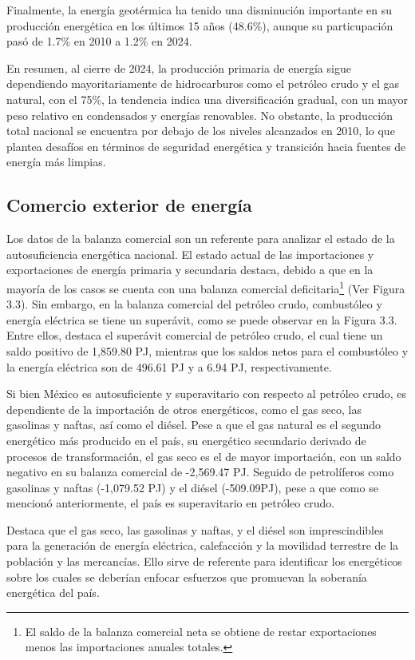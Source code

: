 \documentclass{sener2025}
\begin{document}
Finalmente, la energía geotérmica ha tenido una disminución importante en su producción energética en los últimos 15 años (48.6\%), aunque su particupación pasó de 1.7\% en 2010 a 1.2\% en 2024.

En resumen, al cierre de 2024, la producción primaria de energía sigue dependiendo mayoritariamente de hidrocarburos como el petróleo crudo y el gas natural, con el 75\%, la tendencia indica una diversificación gradual, con un mayor peso relativo en condensados y energías renovables. No obstante, la producción total nacional se encuentra por debajo de los niveles alcanzados en 2010, lo que plantea desafíos en términos de seguridad energética y transición hacia fuentes de energía más limpias.


\subsection{Comercio exterior de energía}

Los datos de la balanza comercial son un referente para analizar el estado de la autosuficiencia energética nacional. El estado actual de las importaciones y exportaciones de energía primaria y secundaria destaca, debido a que en la mayoría de los casos se cuenta con una balanza comercial deficitaria\footnote{El saldo de la balanza comercial neta se obtiene de restar exportaciones menos las importaciones anuales totales.} (Ver Figura 3.3). Sin embargo, en la balanza comercial del petróleo crudo, combustóleo y energía eléctrica se tiene un superávit, como se puede observar en la Figura 3.3. Entre ellos, destaca el superávit comercial de petróleo crudo, el cual tiene un saldo positivo de 1,859.80 PJ, mientras que los saldos netos para el combustóleo y la energía eléctrica son de 496.61 PJ y a 6.94 PJ, respectivamente.

Si bien México es autosuficiente y superavitario con respecto al petróleo crudo, es dependiente de la importación de otros energéticos, como el gas seco, las gasolinas y naftas, así como el diésel. Pese a que el gas natural es el segundo energético más producido en el país, su energético secundario derivado de procesos de transformación, el gas seco es el de mayor importación, con un saldo negativo en su balanza comercial de -2,569.47 PJ. Seguido de petrolíferos como gasolinas y naftas (-1,079.52 PJ) y el diésel (-509.09PJ), pese a que como se mencionó anteriormente, el país es superavitario en petróleo crudo.

Destaca que el gas seco, las gasolinas y naftas, y el diésel son imprescindibles para la generación de energía eléctrica, calefacción y la movilidad terrestre de la población y las mercancías. Ello sirve de referente para identificar los energéticos sobre los cuales se deberían enfocar esfuerzos que promuevan la soberanía energética del país.
\end{document}
